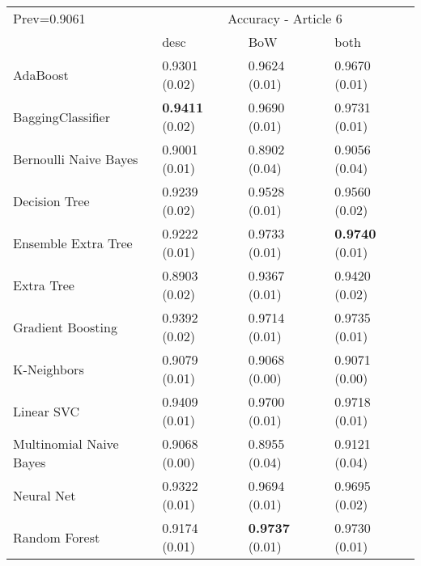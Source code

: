 \begin{tabular}{|l|l|l|l| }
\hline
Prev=0.9061 &  \multicolumn{3}{c|}{Accuracy - Article 6} \\
\cline{2-4} & desc & BoW & both \\ \hline
AdaBoost                & 0.9301 (0.02) & 0.9624 (0.01) & 0.9670 (0.01)\\
BaggingClassifier       & {\bf 0.9411} (0.02) & 0.9690 (0.01) & 0.9731 (0.01)\\
Bernoulli Naive Bayes   & 0.9001 (0.01) & 0.8902 (0.04) & 0.9056 (0.04)\\
Decision Tree           & 0.9239 (0.02) & 0.9528 (0.01) & 0.9560 (0.02)\\
Ensemble Extra Tree     & 0.9222 (0.01) & 0.9733 (0.01) & {\bf 0.9740} (0.01)\\
Extra Tree              & 0.8903 (0.02) & 0.9367 (0.01) & 0.9420 (0.02)\\
Gradient Boosting       & 0.9392 (0.02) & 0.9714 (0.01) & 0.9735 (0.01)\\
K-Neighbors             & 0.9079 (0.01) & 0.9068 (0.00) & 0.9071 (0.00)\\
Linear SVC              & 0.9409 (0.01) & 0.9700 (0.01) & 0.9718 (0.01)\\
Multinomial Naive Bayes & 0.9068 (0.00) & 0.8955 (0.04) & 0.9121 (0.04)\\
Neural Net              & 0.9322 (0.01) & 0.9694 (0.01) & 0.9695 (0.02)\\
Random Forest           & 0.9174 (0.01) & {\bf 0.9737} (0.01) & 0.9730 (0.01)\\
\hline
\end{tabular}